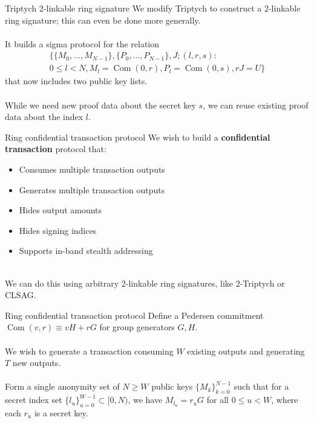 \documentclass[aspectratio=169]{beamer}
\newcommand{\com}{\operatorname{Com}}
\begin{document}
\begin{frame}{Triptych 2-linkable ring signature}
We modify Triptych to construct a 2-linkable ring signature; this can even be done more generally.
\\~\\
It builds a sigma protocol for the relation
\begin{multline*}
\Big\{\{M_0,\ldots,M_{N-1}\}, \{P_0,\ldots,P_{N-1}\}, J;(l,r,s) : \\
0 \leq l < N, M_l = \com(0,r), P_l = \com(0,s), rJ = U\Big\}
\end{multline*}
that now includes two public key lists.
\\~\\
While we need new proof data about the secret key $s$, we can reuse existing proof data about the index $l$.
\end{frame}


\begin{frame}{Ring confidential transaction protocol}
We wish to build a \textbf{confidential transaction} protocol that:
\begin{itemize}
\item Consumes multiple transaction outputs
\item Generates multiple transaction outputs
\item Hides output amounts
\item Hides signing indices
\item Supports in-band stealth addressing
\end{itemize}
~\\
We can do this using arbitrary 2-linkable ring signatures, like 2-Triptych or CLSAG.
\end{frame}


\begin{frame}{Ring confidential transaction protocol}
Define a Pedersen commitment $\com(v,r) \equiv vH + rG$ for group generators $G,H$.
\\~\\
We wish to generate a transaction consuming $W$ existing outputs and generating $T$ new outputs.
\\~\\
Form a single anonymity set of $N \geq W$ public keys $\{M_k\}_{k=0}^{N-1}$ such that for a secret index set $\{l_u\}_{u=0}^{W-1} \subset [0,N)$, we have $M_{l_u} = r_uG$ for all $0 \leq u < W$, where each $r_u$ is a secret key.
\end{frame}
\end{document}
